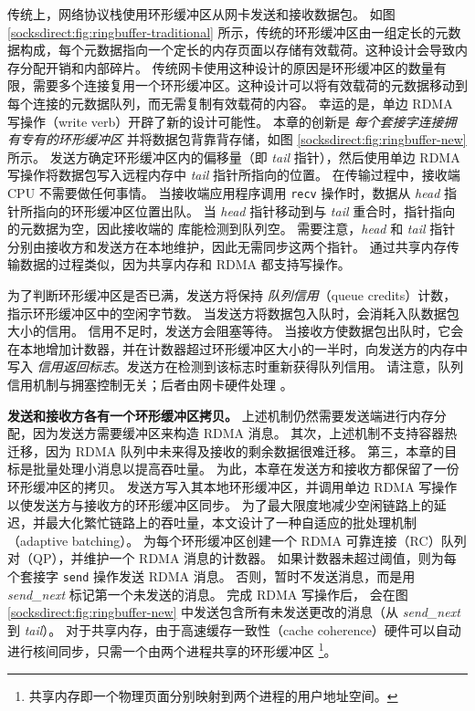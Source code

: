 传统上，网络协议栈使用环形缓冲区从网卡发送和接收数据包。
如图 \ref {socksdirect:fig:ringbuffer-traditional} 所示，传统的环形缓冲区由一组定长的元数据构成，每个元数据指向一个定长的内存页面以存储有效载荷。这种设计会导致内存分配开销和内部碎片。
传统网卡使用这种设计的原因是环形缓冲区的数量有限，需要多个连接复用一个环形缓冲区。这种设计可以将有效载荷的元数据移动到每个连接的元数据队列，而无需复制有效载荷的内容。
幸运的是，单边 RDMA 写操作（write verb）开辟了新的设计可能性。
本章的创新是 \emph {每个套接字连接拥有专有的环形缓冲区} 并将数据包背靠背存储，如图 \ref {socksdirect:fig:ringbuffer-new} 所示。
发送方确定环形缓冲区内的偏移量（即 \emph{tail} 指针），然后使用单边 RDMA 写操作将数据包写入远程内存中 \emph{tail} 指针所指向的位置。
在传输过程中，接收端 CPU 不需要做任何事情。
当接收端应用程序调用 \texttt {recv} 操作时，数据从 \emph {head} 指针所指向的环形缓冲区位置出队。
当 \emph{head} 指针移动到与 \emph{tail} 重合时，指针指向的元数据为空，因此接收端的 \libipc{} 库能检测到队列空。
需要注意，\emph{head} 和 \emph{tail} 指针分别由接收方和发送方在本地维护，因此无需同步这两个指针。
通过共享内存传输数据的过程类似，因为共享内存和 RDMA 都支持写操作。



为了判断环形缓冲区是否已满，发送方将保持 \textit {队列信用}（queue credits）计数，指示环形缓冲区中的空闲字节数。
当发送方将数据包入队时，会消耗入队数据包大小的信用。
信用不足时，发送方会阻塞等待。
当接收方使数据包出队时，它会在本地增加计数器，并在计数器超过环形缓冲区大小的一半时，向发送方的内存中写入 \textit {信用返回标志}。发送方在检测到该标志时重新获得队列信用。
请注意，队列信用机制与拥塞控制无关；后者由网卡硬件处理 \cite {zhu2015congestion}。

\textbf {发送和接收方各有一个环形缓冲区拷贝。}
上述机制仍然需要发送端进行内存分配，因为发送方需要缓冲区来构造 RDMA 消息。
其次，上述机制不支持容器热迁移，因为 RDMA 队列中未来得及接收的剩余数据很难迁移。
第三，本章的目标是批量处理小消息以提高吞吐量。
为此，本章在发送方和接收方都保留了一份环形缓冲区的拷贝。
发送方写入其本地环形缓冲区，并调用单边 RDMA 写操作以使发送方与接收方的环形缓冲区同步。
为了最大限度地减少空闲链路上的延迟，并最大化繁忙链路上的吞吐量，本文设计了一种自适应的批处理机制（adaptive batching）。
\libipc{} 为每个环形缓冲区创建一个 RDMA 可靠连接（RC）队列对（QP），并维护一个 RDMA 消息的计数器。
如果计数器未超过阈值，则为每个套接字 \texttt {send} 操作发送 RDMA 消息。
否则，暂时不发送消息，而是用 \emph {send\_next} 标记第一个未发送的消息。
完成 RDMA 写操作后，\libipc{} 会在图 \ref {socksdirect:fig:ringbuffer-new} 中发送包含所有未发送更改的消息（从 \emph {send\_next} 到 \emph {tail}）。
对于共享内存，由于高速缓存一致性（cache coherence）硬件可以自动进行核间同步，只需一个由两个进程共享的环形缓冲区 \footnote{共享内存即一个物理页面分别映射到两个进程的用户地址空间。}。

